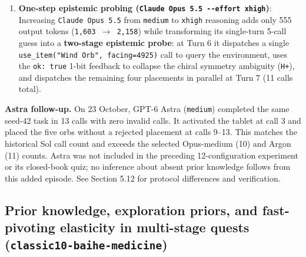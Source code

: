 \documentclass[11pt,a4paper]{article}
\begin{document}
\begin{enumerate}
\item \textbf{One-step epistemic probing (\texttt{Claude\allowbreak{} \allowbreak{}Opus\allowbreak{} \allowbreak{}5\allowbreak{}.\allowbreak{}5\allowbreak{} \allowbreak{}-\allowbreak{}-\allowbreak{}effort\allowbreak{} \allowbreak{}xhigh})}: Increasing \texttt{Claude\allowbreak{} \allowbreak{}Opus\allowbreak{} \allowbreak{}5\allowbreak{}.\allowbreak{}5} from \texttt{medium} to \texttt{xhigh} reasoning adds only 555 output tokens (\texttt{1\allowbreak{},\allowbreak{}603\allowbreak{} \allowbreak{}\ensuremath{\rightarrow}\allowbreak{} \allowbreak{}2\allowbreak{},\allowbreak{}158}) while transforming its single-turn 5-call guess into a \textbf{two-stage epistemic probe}: at Turn 6 it dispatches a single \texttt{use\allowbreak{}\_\allowbreak{}item("Wind\allowbreak{} \allowbreak{}Orb"\allowbreak{},\allowbreak{} \allowbreak{}facing\allowbreak{}=\allowbreak{}4925)} call to query the environment, uses the \texttt{ok\allowbreak{}:\allowbreak{} \allowbreak{}true} 1-bit feedback to collapse the chiral symmetry ambiguity (\texttt{H+}), and dispatches the remaining four placements in parallel at Turn 7 (11 calls total).

\end{enumerate}
\textbf{Astra follow-up.} On 23 October, GPT-6 Astra (\texttt{medium}) completed the same seed-42 task in 13 calls with zero invalid calls. It activated the tablet at call 3 and placed the five orbs without a rejected placement at calls 9--13. This matches the historical Sol call count and exceeds the selected Opus-medium (10) and Argon (11) counts. Astra was not included in the preceding 12-configuration experiment or its closed-book quiz; no inference about absent prior knowledge follows from this added episode. See Section 5.12 for protocol differences and verification.

\subsection{\texorpdfstring{Prior knowledge, exploration priors, and fast-pivoting elasticity in multi-stage quests (\texttt{classic10\allowbreak{}-\allowbreak{}baihe\allowbreak{}-\allowbreak{}medicine})}{Prior knowledge, exploration priors, and fast-pivoting elasticity in multi-stage quests (classic10-baihe-medicine)}}
\end{document}
